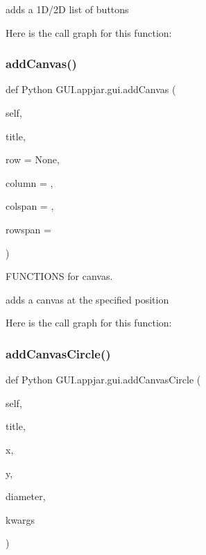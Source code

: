 \begin{DoxyVerb}adds a 1D/2D list of buttons \end{DoxyVerb}
 Here is the call graph for this function\+:
\mbox{\label{class_python_01_g_u_i_1_1appjar_1_1gui_a6459e922c9b6fd74d27a69bbb17845e3}} 
\subsubsection{\texorpdfstring{add\+Canvas()}{addCanvas()}}
{\footnotesize\ttfamily def Python G\+U\+I.\+appjar.\+gui.\+add\+Canvas (\begin{DoxyParamCaption}\item[{}]{self,  }\item[{}]{title,  }\item[{}]{row = {\ttfamily None},  }\item[{}]{column = {},  }\item[{}]{colspan = {},  }\item[{}]{rowspan = {} }\end{DoxyParamCaption})}



F\+U\+N\+C\+T\+I\+O\+NS for canvas. 

\begin{DoxyVerb}adds a canvas at the specified position \end{DoxyVerb}
 Here is the call graph for this function\+:
\mbox{\label{class_python_01_g_u_i_1_1appjar_1_1gui_a867b3dfc3ce4f596fce4bb61b6b78cbe}} 
\subsubsection{\texorpdfstring{add\+Canvas\+Circle()}{addCanvasCircle()}}
{\footnotesize\ttfamily def Python G\+U\+I.\+appjar.\+gui.\+add\+Canvas\+Circle (\begin{DoxyParamCaption}\item[{}]{self,  }\item[{}]{title,  }\item[{}]{x,  }\item[{}]{y,  }\item[{}]{diameter,  }\item[{}]{kwargs }\end{DoxyParamCaption})}

